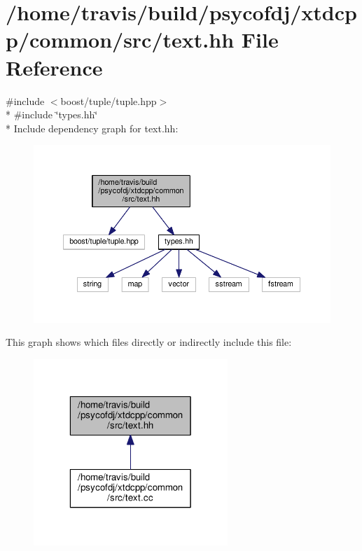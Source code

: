 \hypertarget{text_8hh}{\section{/home/travis/build/psycofdj/xtdcpp/common/src/text.hh File Reference}
\label{text_8hh}
}
{\ttfamily \#include $<$boost/tuple/tuple.\-hpp$>$}\\*
{\ttfamily \#include \char`\"{}types.\-hh\char`\"{}}\\*
Include dependency graph for text.\-hh\-:
\nopagebreak
\begin{figure}[H]
\begin{center}
\leavevmode
\includegraphics[width=350pt]{text_8hh__incl}
\end{center}
\end{figure}
This graph shows which files directly or indirectly include this file\-:
\nopagebreak
\begin{figure}[H]
\begin{center}
\leavevmode
\includegraphics[width=208pt]{text_8hh__dep__incl}
\end{center}
\end{figure}
